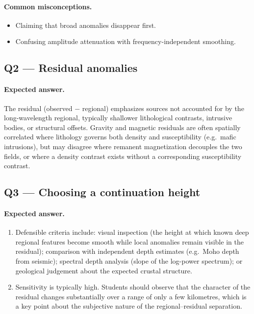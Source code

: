 \documentclass[11pt]{article}
\begin{document}
\paragraph{Common misconceptions.}
\begin{itemize}
  \item Claiming that broad anomalies disappear first.
  \item Confusing amplitude attenuation with frequency-independent smoothing.
\end{itemize}

\subsection*{Q2 — Residual anomalies}

\paragraph{Expected answer.}
The residual (observed $-$ regional) emphasizes sources not accounted for by the
long-wavelength regional, typically shallower lithological contrasts, intrusive
bodies, or structural offsets.  Gravity and magnetic residuals are often
spatially correlated where lithology governs both density and susceptibility
(e.g.\ mafic intrusions), but may disagree where remanent magnetization decouples
the two fields, or where a density contrast exists without a corresponding
susceptibility contrast.

\subsection*{Q3 — Choosing a continuation height}

\paragraph{Expected answer.}
\begin{enumerate}[label=\alph*.]
  \item Defensible criteria include: visual inspection (the height at which known
        deep regional features become smooth while local anomalies remain visible
        in the residual); comparison with independent depth estimates (e.g.\ Moho
        depth from seismic); spectral depth analysis (slope of the log-power
        spectrum); or geological judgement about the expected crustal structure.
  \item Sensitivity is typically high.  Students should observe that the
        character of the residual changes substantially over a range of only a
        few kilometres, which is a key point about the subjective nature of the
        regional--residual separation.
\end{enumerate}
\end{document}
